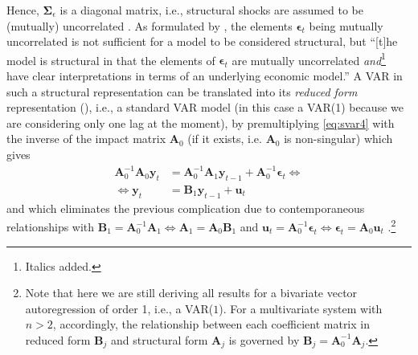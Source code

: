 \documentclass[a4paper,11pt,listof=nochaptergap,oneside,pointednumbers,bibtotoc,bigheadings,liststotoc,hidelinks]{scrbook}
\theoremstyle{mysatz}
\theoremstyle{mydefinition}
\theoremstyle{mytheorem}
\theoremstyle{mybemerkung}
\newcommand{\vect}[1]{\boldsymbol{\mathbf{#1}}}
\begin{document}
Hence, $\vect{\Sigma}_\epsilon$ is a diagonal matrix, i.e., structural shocks are assumed to be (mutually) uncorrelated \citep{lutkepohlkilian:17}. As formulated by \citet[p. 109/p. 217]{lutkepohlkilian:17}, the elements $\vect{\epsilon}_t$ being mutually uncorrelated is not sufficient for a model to be considered structural, but  ``[t]he model is structural in that the elements of $\vect{\epsilon}_t$ are mutually uncorrelated \textit{and}\footnote{Italics added.} have clear interpretations in terms of an underlying economic model.'' A VAR in such a structural representation can be translated into its \textit{reduced form} representation (\citealp{lutkepohlkilian:17}), i.e., a standard VAR model (in this case a VAR(1) because we are considering only one lag at the moment), by premultiplying \ref{eq:svar4} with the inverse of the impact matrix $\vect{A}_0$ (if it exists, i.e. $\vect{A}_0$ is non-singular) which gives
\begin{equation} \label{eq:svar5}
\begin{split}
	          \vect{A}_0^{-1}\vect{A}_0\vect{y}_t & = \vect{A}_0^{-1}\vect{A}_1\vect{y}_{t-1} + \vect{A}_0^{-1}\vect{\epsilon}_t     \iff \\
	\iff 						\vect{y}_t & = \vect{B}_1\vect{y}_{t-1} + \vect{u}_t
\end{split}								
\end{equation}
and which eliminates the previous complication due to contemporaneous relationships with $\vect{B}_1 = \vect{A}_0^{-1}\vect{A}_1 \iff \vect{A}_1 = \vect{A}_0\vect{B}_1$ and $\vect{u}_t = \vect{A}_0^{-1}\vect{\epsilon}_t \iff \vect{\epsilon}_t = \vect{A}_0\vect{u}_t$ \citep{lutkepohlkilian:17}.\footnote{Note that here we are still deriving all results for a bivariate vector autoregression of order 1, i.e., a VAR($1$). For a multivariate system with $n>2$, accordingly, the relationship between each coefficient matrix in reduced form $\vect{B}_j$ and structural form $\vect{A}_j$ is governed by $\vect{B}_j = \vect{A}_0^{-1}\vect{A}_j$.}
\end{document}
